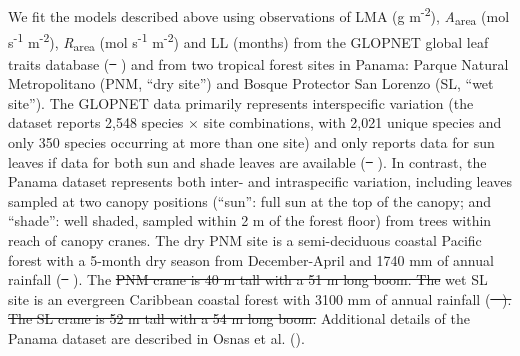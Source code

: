\documentclass[
  12pt,
  letterpaper,
  DIV=11,
  numbers=noendperiod]{scrartcl}
\providecommand{\DIFadd}[1]{{\protect\color{blue}\uwave{#1}}} %
\providecommand{\DIFdel}[1]{{\protect\color{red}\sout{#1}}}                      %
\providecommand{\DIFaddbegin}{} %
\providecommand{\DIFaddend}{} %
\providecommand{\DIFdelbegin}{} %
\providecommand{\DIFdelend}{} %
\newcommand{\DIFscaledelfig}{0.5}
\newlength{\DIFdelgraphicswidth} %
\newlength{\DIFdelgraphicsheight} %
\newcommand{\DIFaddincludegraphics}[2][]{{\color{blue}\fbox{\DIFOincludegraphics[#1]{#2}}}} %
\newcommand{\DIFdelincludegraphics}[2][]{%
\sbox{\DIFdelgraphicsbox}{\DIFOincludegraphics[#1]{#2}}%
\settoboxwidth{\DIFdelgraphicswidth}{\DIFdelgraphicsbox} %
\settoboxtotalheight{\DIFdelgraphicsheight}{\DIFdelgraphicsbox} %
\scalebox{\DIFscaledelfig}{%
\parbox[b]{\DIFdelgraphicswidth}{\usebox{\DIFdelgraphicsbox}\\[-\baselineskip] \rule{\DIFdelgraphicswidth}{0em}}\llap{\resizebox{\DIFdelgraphicswidth}{\DIFdelgraphicsheight}{%
\setlength{\unitlength}{\DIFdelgraphicswidth}%
\begin{picture}(1,1)%
\thicklines\linethickness{2pt} %
{\color[rgb]{1,0,0}\put(0,0){\framebox(1,1){}}}%
{\color[rgb]{1,0,0}\put(0,0){\line( 1,1){1}}}%
{\color[rgb]{1,0,0}\put(0,1){\line(1,-1){1}}}%
\end{picture}%
}\hspace*{3pt}}} %
} %
\DeclareRobustCommand{\DIFaddbegin}{\DIFOaddbegin \let\includegraphics\DIFaddincludegraphics} %
\DeclareRobustCommand{\DIFaddend}{\DIFOaddend \let\includegraphics\DIFOincludegraphics} %
\DeclareRobustCommand{\DIFdelbegin}{\DIFOdelbegin \let\includegraphics\DIFdelincludegraphics} %
\DeclareRobustCommand{\DIFdelend}{\DIFOaddend \let\includegraphics\DIFOincludegraphics} %
\begin{document}
We fit the models described above using observations of LMA (g
m\textsuperscript{-2}), \emph{A}\textsubscript{area} (mol
s\textsuperscript{-1} m\textsuperscript{-2}),
\emph{R}\textsubscript{area} (mol s\textsuperscript{-1}
m\textsuperscript{-2}) and LL (months) from the GLOPNET global leaf
traits database (\DIFdelbegin \DIFdel{\mbox{%
\citeproc{ref-Wright2004a}{Wright et al. 2004}}\hspace{0pt}%
}\DIFdelend \DIFaddbegin \DIFadd{\mbox{%
\citeproc{ref-Wright2004a}{Wright et al., 2004}}\hspace{0pt}%
}\DIFaddend ) and
from two tropical forest sites in Panama: Parque Natural Metropolitano
(PNM, ``dry site'') and Bosque Protector San Lorenzo (SL, ``wet site'').
The GLOPNET data primarily represents interspecific variation (the
dataset reports 2,548 species \(\times\) site combinations, with 2,021
unique species and only 350 species occurring at more than one site) and
only reports data for sun leaves if data for both sun and shade leaves
are available (\DIFdelbegin \DIFdel{\mbox{%
\citeproc{ref-Wright2004a}{Wright et al. 2004}}\hspace{0pt}%
}\DIFdelend \DIFaddbegin \DIFadd{\mbox{%
\citeproc{ref-Wright2004a}{Wright et al., 2004}}\hspace{0pt}%
}\DIFaddend ). In
contrast, the Panama dataset represents both inter- and intraspecific
variation, including leaves sampled at two canopy positions (``sun'':
full sun at the top of the canopy; and ``shade'': well shaded, sampled
within 2 m of the forest floor) from trees within reach of canopy
cranes. The dry PNM site is a semi-deciduous coastal Pacific forest with
a 5-month dry season from December-April and 1740 mm of annual rainfall
(\DIFdelbegin \DIFdel{\mbox{%
\citeproc{ref-Wright2003}{Wright et al. 2003}}\hspace{0pt}%
}\DIFdelend \DIFaddbegin \DIFadd{\mbox{%
\citeproc{ref-Wright2003}{Wright et al., 2003}}\hspace{0pt}%
}\DIFaddend ). The \DIFdelbegin \DIFdel{PNM crane is 40 m
tall with a 51 m long boom. The }\DIFdelend wet SL site is an
evergreen Caribbean coastal forest with 3100 mm of annual rainfall
(\DIFdelbegin \DIFdel{\mbox{%
\citeproc{ref-Wright2003}{Wright et al. 2003}}\hspace{0pt}%
). The SL crane is 52 m
tall with a 54 m long boom. }\DIFdelend \DIFaddbegin \DIFadd{\mbox{%
\citeproc{ref-Wright2003}{Wright et al., 2003}}\hspace{0pt}%
). }\DIFaddend Additional details of
the Panama dataset are described in Osnas et al.
().
\end{document}
